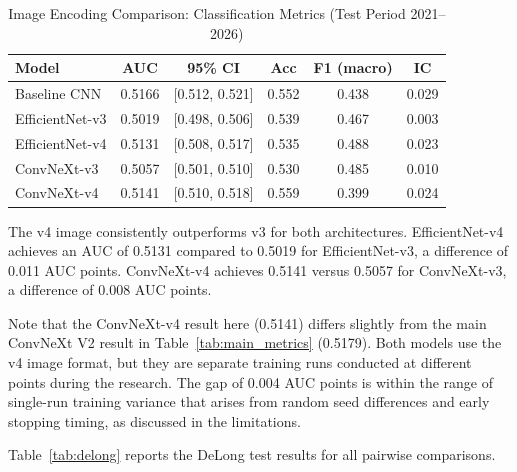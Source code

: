 \begin{table}[H]
\centering
\caption{Image Encoding Comparison: Classification Metrics (Test Period 2021--2026)}
\label{tab:comparison_metrics}
\small
\begin{tabular}{lccccc}
\toprule
\textbf{Model} & \textbf{AUC} & \textbf{95\% CI} & \textbf{Acc} & \textbf{F1 (macro)} & \textbf{IC} \\
\midrule
Baseline CNN      & 0.5166 & [0.512, 0.521] & 0.552 & 0.438 & 0.029 \\
EfficientNet-v3   & 0.5019 & [0.498, 0.506] & 0.539 & 0.467 & 0.003 \\
EfficientNet-v4   & 0.5131 & [0.508, 0.517] & 0.535 & 0.488 & 0.023 \\
ConvNeXt-v3       & 0.5057 & [0.501, 0.510] & 0.530 & 0.485 & 0.010 \\
ConvNeXt-v4       & 0.5141 & [0.510, 0.518] & 0.559 & 0.399 & 0.024 \\
\bottomrule
\end{tabular}
\end{table}

The v4 image consistently outperforms v3 for both architectures. EfficientNet-v4 achieves an AUC of 0.5131 compared to 0.5019 for EfficientNet-v3, a difference of 0.011 AUC points. ConvNeXt-v4 achieves 0.5141 versus 0.5057 for ConvNeXt-v3, a difference of 0.008 AUC points.

Note that the ConvNeXt-v4 result here (0.5141) differs slightly from the main ConvNeXt V2 result in Table~\ref{tab:main_metrics} (0.5179). Both models use the v4 image format, but they are separate training runs conducted at different points during the research. The gap of 0.004 AUC points is within the range of single-run training variance that arises from random seed differences and early stopping timing, as discussed in the limitations.

Table~\ref{tab:delong} reports the DeLong test results for all pairwise comparisons.

